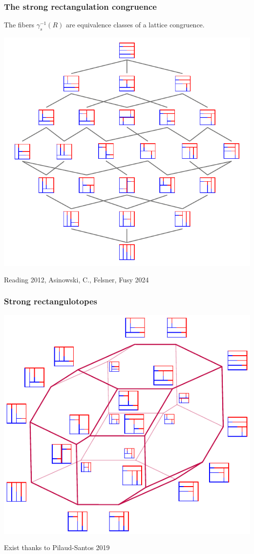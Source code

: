 \documentclass[11pt]{beamer}%
\newcommand{\green}{\color{darkgreen}}
\newcommand{\auth}[1]{{\green\hfill{\footnotesize #1}}}
\begin{document}
\begin{frame}
  \frametitle{The strong rectangulation congruence}
    The fibers $\gamma_s^{-1}(R)$ are equivalence classes of a lattice congruence.

    \begin{center}
    \includegraphics[height=.7\textheight]{strongRectangulationLattice.pdf}
  \end{center}
  \auth{Reading 2012, Asinowski, C., Felsner, Fusy 2024}
\end{frame}

\begin{frame}
  \frametitle{Strong rectangulotopes}
  \begin{center}
    \includegraphics[height=.7\textheight]{strongRectangulotopeLabeled.pdf}
  \end{center}
  Exist thanks to \auth{Pilaud-Santos 2019}
\end{frame}
\end{document}
